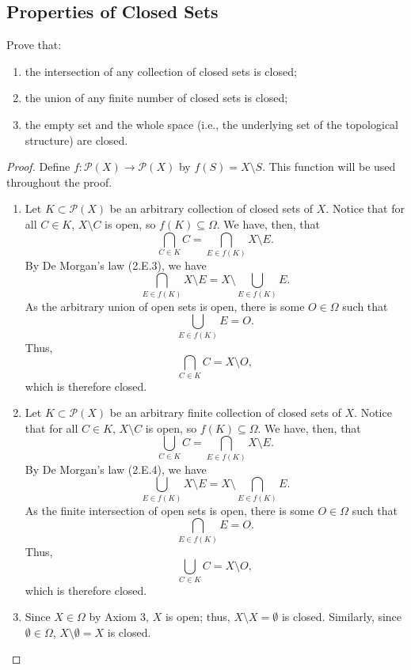 \subsection{Properties of Closed Sets}

\begin{majorEx}
    Prove that:
    \begin{enumerate}
        \item the intersection of any collection of closed sets is closed;
        \item the union of any finite number of closed sets is closed;
        \item the empty set and the whole space (i.e., the underlying set of the
            topological structure) are closed.
    \end{enumerate}
\end{majorEx}

\begin{proof}
    Define $f : \mathcal{P}(X) \to \mathcal{P}(X)$ by $f(S) = X \setminus S$.
    This function will be used throughout the proof.
    \begin{enumerate}
        \item Let $K \subset \mathcal{P}(X)$ be an arbitrary collection of
            closed sets of $X$. Notice that for all $C \in K$, $X \setminus C$
            is open, so $f(K) \subseteq \Omega$. We have, then, that
            \[
                \bigcap_{C \in K} C = \bigcap_{E \in f(K)} X \setminus E.
            \]
            By De Morgan's law (2.E.3), we have
            \[
                \bigcap_{E \in f(K)} X \setminus E = X \setminus
                \bigcup_{E \in f(K)} E.
            \]
            As the arbitrary union of open sets is open, there is some $O \in
            \Omega$ such that
            \[
                \bigcup_{E \in f(K)} E = O.
            \]
            Thus,
            \[
                \bigcap_{C \in K} C = X \setminus O,
            \]
            which is therefore closed.
        \item Let $K \subset \mathcal{P}(X)$ be an arbitrary finite collection
            of closed sets of $X$. Notice that for all $C \in K$, $X \setminus
            C$ is open, so $f(K) \subseteq \Omega$. We have, then, that
            \[
                \bigcup_{C \in K} C = \bigcap_{E \in f(K)} X \setminus E.
            \]
            By De Morgan's law (2.E.4), we have
            \[
                \bigcup_{E \in f(K)} X \setminus E = X \setminus \bigcap_{E \in
                f(K)} E.
            \]
            As the finite intersection of open sets is open, there is some $O
            \in \Omega$ such that
            \[
                \bigcap_{E \in f(K)} E = O.
            \]
            Thus,
            \[
                \bigcup_{C \in K} C = X \setminus O,
            \]
            which is therefore closed.
        \item Since $X \in \Omega$ by Axiom 3, $X$ is open; thus, $X \setminus X
            = \emptyset$ is closed. Similarly, since $\emptyset \in \Omega$, $X
            \setminus \emptyset = X$ is closed.
    \end{enumerate}
\end{proof}
